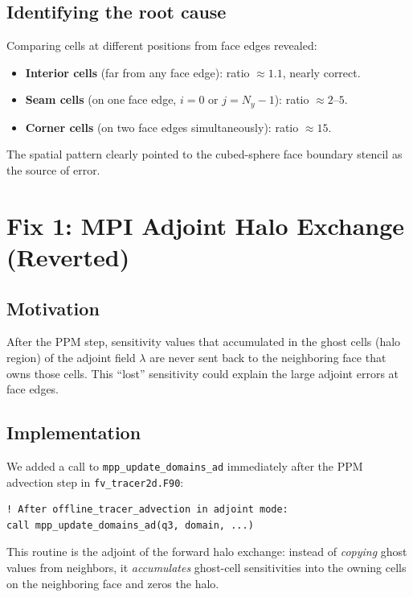 \documentclass[11pt]{article}
\begin{document}
\subsection{Identifying the root cause}

Comparing cells at different positions from face edges revealed:
\begin{itemize}
  \item \textbf{Interior cells} (far from any face edge): ratio $\approx 1.1$,
    nearly correct.
  \item \textbf{Seam cells} (on one face edge, $i=0$ or $j=N_y-1$):
    ratio $\approx 2$--$5$.
  \item \textbf{Corner cells} (on two face edges simultaneously): ratio
    $\approx 15$.
\end{itemize}
The spatial pattern clearly pointed to the cubed-sphere face boundary
stencil as the source of error.

\section{Fix 1: MPI Adjoint Halo Exchange (Reverted)}

\subsection{Motivation}

After the PPM step, sensitivity values that accumulated in the ghost cells
(halo region) of the adjoint field $\lambda$ are never sent back to the
neighboring face that owns those cells. This ``lost'' sensitivity could
explain the large adjoint errors at face edges.

\subsection{Implementation}

We added a call to \texttt{mpp\_update\_domains\_ad} immediately after the
PPM advection step in \texttt{fv\_tracer2d.F90}:
\begin{lstlisting}
! After offline_tracer_advection in adjoint mode:
call mpp_update_domains_ad(q3, domain, ...)
\end{lstlisting}
This routine is the adjoint of the forward halo exchange: instead of
\emph{copying} ghost values from neighbors, it \emph{accumulates} ghost-cell
sensitivities into the owning cells on the neighboring face and zeros the
halo.
\end{document}
